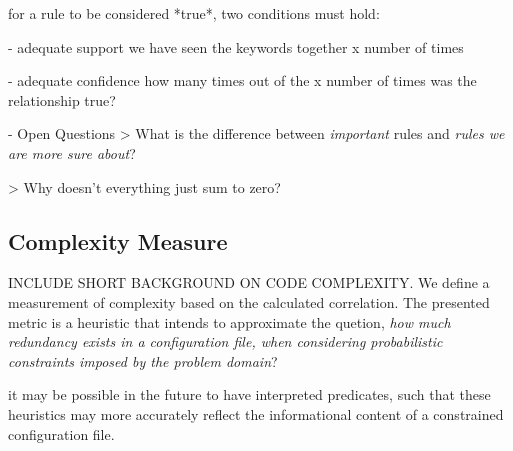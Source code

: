           for a rule to be considered *true*, two conditions must hold:

            - adequate support
                we have seen the keywords together x number of times

            - adequate confidence
                how many times out of the x number of times 
                was the relationship true?

    - Open Questions
        > What is the difference between {\it important} rules and
          {\it rules we are more sure about}?

        > Why doesn't everything just sum to zero?

\subsection{Complexity Measure}

INCLUDE SHORT BACKGROUND ON CODE COMPLEXITY. We define a measurement
of complexity based on the calculated correlation. The presented
metric is a heuristic that intends to approximate the quetion, 
{\it how much redundancy exists in a configuration file, when considering
probabilistic constraints imposed by the problem domain}?

it may be possible in the future to have interpreted predicates,
such that these heuristics may more accurately reflect the informational
content of a constrained configuration file.

\fi




